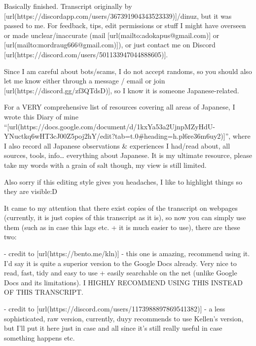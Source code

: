 \startsectionlevel[title={By nunko/dinuz},reference={by-nunkodinuz}]

Basically finished. Transcript originally by [url(https://discordapp.com/users/367391904343523339)]/dinuz, but it was passed to me. For feedback, tips, edit permissions or stuff I might have overseen or made unclear/inaccurate (mail [url(mailto:adokapus@gmail.com)] or [url(mailto:mordraug666@gmail.com)]), or just contact me on Discord [url(https://discord.com/users/501133947044888605)].

Since I am careful about bots/scams, I do not accept randoms, so you should also let me know either through a message / email or join [url(https://discord.gg/zf3QTdsD)], so I know it is someone Japanese-related.

For a VERY comprehensive list of resources covering all areas of Japanese, I wrote this Diary of mine “[url(https://docs.google.com/document/d/1kxYa53a2UjnpMZyHdU-YNuctkq6wHT3cJ00Z5poj2hY/edit?tab=t.0\#heading=h.pl6re36m6uy2)]”, where I also record all Japanese observations & experiences I had/read about, all sources, tools, info\ldots{} everything about Japanese. It is my ultimate resource, please take my words with a grain of salt though, my view is still limited.

Also sorry if this editing style gives you headaches, I like to highlight things so they are visible:D

\thinrule

It came to my attention that there exist copies of the transcript on webpages (currently, it is just copies of this transcript as it is), so now you can simply use them (such as in case this lags etc. + it is much easier to use), there are these two:

\from[url1] - credit to [url(https://bento.me/kln)] - this one is amazing, recommend using it. I'd say it is quite a superior version to the Google Docs already. Very nice to read, fast, tidy and easy to use + easily searchable on the net (unlike Google Docs and its limitations). I HIGHLY RECOMMEND USING THIS INSTEAD OF THIS TRANSCRIPT.

\from[url2] - credit to [url(https://discord.com/users/1173988897869541382)] - a less sophisticated, raw version, currently, duyy recommends to use Kellen's version, but I'll put it here just in case and all since it's still really useful in case something happens etc.

